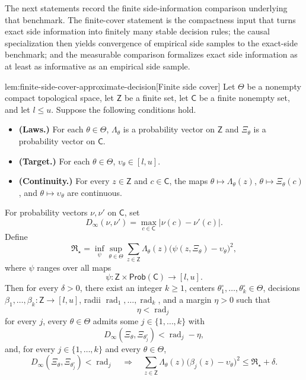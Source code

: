 The next statements record the finite side-information comparison underlying that benchmark. The finite-cover statement is the compactness input that turns exact side information into finitely many stable decision rules; the causal specialization then yields convergence of empirical side samples to the exact-side benchmark; and the measurable comparison formalizes exact side information as at least as informative as an empirical side sample.

\begin{lemmav}{lem:finite-side-cover-approximate-decision}[Finite side cover]
Let \(\Theta\) be a nonempty compact topological space, let \(\mathsf Z\) be a finite set, let \(\mathsf C\) be a finite nonempty set, and let \(l\le u\). Suppose the following conditions hold.
\begin{itemize}
\item \textbf{(Laws.)} For each \(\theta\in\Theta\), \(\Lambda_\theta\) is a probability vector on \(\mathsf Z\) and \(\Xi_\theta\) is a probability vector on \(\mathsf C\).
\item \textbf{(Target.)} For each \(\theta\in\Theta\), \(\upsilon_\theta\in[l,u]\).
\item \textbf{(Continuity.)} For every \(z\in\mathsf Z\) and \(c\in\mathsf C\), the maps \(\theta\mapsto\Lambda_\theta(z)\), \(\theta\mapsto\Xi_\theta(c)\), and \(\theta\mapsto\upsilon_\theta\) are continuous.
\end{itemize}
For probability vectors \(\nu,\nu'\) on \(\mathsf C\), set
\[
D_\infty(\nu,\nu')=\max_{c\in\mathsf C}|\nu(c)-\nu'(c)|.
\]
Define
\[
\mathfrak R_\star
=
\inf_{\psi}\sup_{\theta\in\Theta}
\sum_{z\in\mathsf Z}\Lambda_\theta(z)
\bigl(\psi(z,\Xi_\theta)-\upsilon_\theta\bigr)^2,
\]
where \(\psi\) ranges over all maps
\[
\psi:\mathsf Z\times\mathsf{Prob}(\mathsf C)\to[l,u].
\]
Then for every \(\delta>0\), there exist an integer \(k\ge1\), centers
\(\theta^\circ_1,\ldots,\theta^\circ_k\in\Theta\), decisions
\(\beta_1,\ldots,\beta_k:\mathsf Z\to[l,u]\), radii
\(\operatorname{rad}_1,\ldots,\operatorname{rad}_k\), and a margin \(\eta>0\) such that
\[
\eta<\operatorname{rad}_j
\]
for every \(j\), every \(\theta\in\Theta\) admits some \(j\in\{1,\ldots,k\}\) with
\[
D_\infty(\Xi_\theta,\Xi_{\theta^\circ_j})<\operatorname{rad}_j-\eta,
\]
and, for every \(j\in\{1,\ldots,k\}\) and every \(\theta\in\Theta\),
\[
D_\infty(\Xi_\theta,\Xi_{\theta^\circ_j})<\operatorname{rad}_j
\quad\Longrightarrow\quad
\sum_{z\in\mathsf Z}\Lambda_\theta(z)
\bigl(\beta_j(z)-\upsilon_\theta\bigr)^2
\le
\mathfrak R_\star+\delta.
\]
\end{lemmav}

